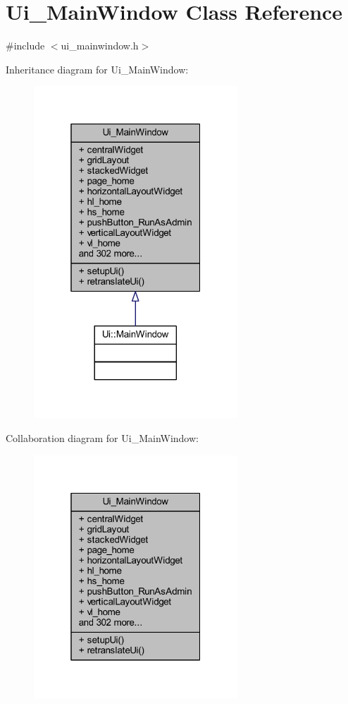 \hypertarget{class_ui___main_window}{}\section{Ui\+\_\+\+Main\+Window Class Reference}
\label{class_ui___main_window}


{\ttfamily \#include $<$ui\+\_\+mainwindow.\+h$>$}



Inheritance diagram for Ui\+\_\+\+Main\+Window\+:\nopagebreak
\begin{figure}[H]
\begin{center}
\leavevmode
\includegraphics[width=217pt]{class_ui___main_window__inherit__graph}
\end{center}
\end{figure}


Collaboration diagram for Ui\+\_\+\+Main\+Window\+:\nopagebreak
\begin{figure}[H]
\begin{center}
\leavevmode
\includegraphics[width=217pt]{class_ui___main_window__coll__graph}
\end{center}
\end{figure}
